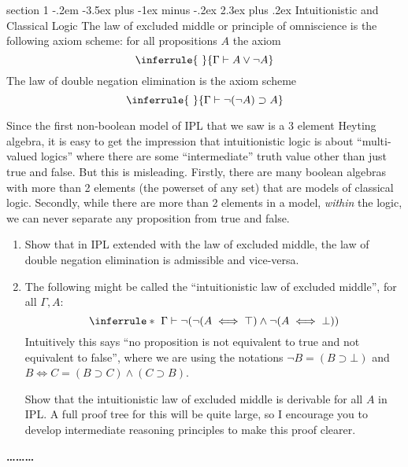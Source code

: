 \documentclass[12pt]{article}
\makeatletter
\newenvironment{problem}{\@startsection
       {section}
       {1}
       {-.2em}
       {-3.5ex plus -1ex minus -.2ex}
       {2.3ex plus .2ex}
       {\pagebreak[3]%
       \large\bf\noindent{Problem }
       }
       }
       {%
       \begin{center}\large\bf \ldots\ldots\ldots\end{center}}
\makeatother
\begin{document}
\begin{problem}{Intuitionistic and Classical Logic}
  The law of excluded middle or principle of omniscience is the
  following axiom scheme: for all propositions $A$ the axiom
  \[
  \inferrule
  {~}
  {\Gamma \vdash A \vee \neg A}
  \]
  The law of double negation elimination is the axiom scheme
  \[
  \inferrule
  {~}
  {\Gamma \vdash \neg(\neg A) \supset A}
  \]

  Since the first non-boolean model of IPL that we saw is a 3 element
  Heyting algebra, it is easy to get the impression that
  intuitionistic logic is about ``multi-valued logics'' where there
  are some ``intermediate'' truth value other than just true and
  false. But this is misleading. Firstly, there are many boolean
  algebras with more than 2 elements (the powerset of any set) that
  are models of classical logic. Secondly, while there are more than 2
  elements in a model, \emph{within} the logic, we can never separate
  any proposition from true and false.

  \begin{enumerate}
  \item Show that in IPL extended with the law of excluded middle, the
    law of double negation elimination is admissible and vice-versa.
  \item The following might be called the ``intuitionistic law of
    excluded middle'', for all $\Gamma, A$:
    \[ \inferrule*{~}{\Gamma \vdash \neg (\neg (A \iff \top) \wedge \neg (A \iff \bot))} \]
    Intuitively this says ``no proposition is not equivalent to true
    and not equivalent to false'', where we are using the notations
    $\neg B = (B \supset \bot)$ and $B \iff C = (B \supset C) \wedge
    (C \supset B)$.

    Show that the intuitionistic law of excluded middle is derivable
    for all $A$ in IPL. A full proof tree for this will be quite
    large, so I encourage you to develop intermediate reasoning
    principles to make this proof clearer.
  \end{enumerate}
\end{problem}
\end{document}
